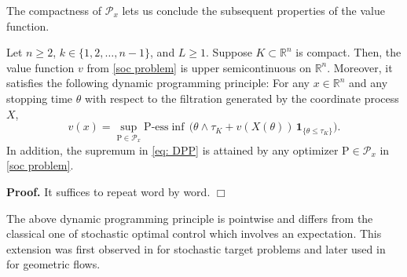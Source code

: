 \documentclass[11pt]{amsart}
\numberwithin{equation}{section}
\newcommand{\ep}{\hfill $\Box$}
\begin{document}
\medskip

The compactness of $\mathcal{P}_x$ lets us conclude the subsequent properties of the value function.

\begin{prop}\label{prop: dpp}
Let $n\geq 2$, $k\in\{1,2,\ldots,n-1\}$, and $L\ge1$. Suppose $K\subset \mathbb{R}^n$ is compact. Then, the value function $v$ from \eqref{soc problem} is upper semicontinuous on $\mathbb{R}^n$. Moreover, it satisfies the following dynamic programming principle: For any $x\in\mathbb{R}^n$ and any stopping time $\theta$ with respect to the filtration generated by the coordinate process $X$,
\begin{equation}\label{eq: DPP}
v(x) = \sup_{\mathrm{P}\in\mathcal{P}_x} \mathrm{P}\text{-}\mathrm{ess} \inf \, \big(\theta\wedge\tau_K + v(X(\theta))\,\mathbf{1}_{\{\theta\leq \tau_K\}}\big).
\end{equation}
In addition, the supremum in \eqref{eq: DPP} is attained by any optimizer $\mathrm{P}\in \mathcal{P}_x$ in \eqref{soc problem}.
\end{prop}

\smallskip

\noindent\textbf{Proof.} It suffices to repeat \cite[proofs of Proposition 2.2(ii), (iii)]{larsson_minimum_2022} word by word. \ep

\begin{rmk}
The above dynamic programming principle is pointwise and differs from the classical one
of stochastic optimal control which involves an expectation. This extension was first observed in \cite{ST98} for stochastic target problems and later used in \cite{soner_dynamic_2002} for geometric flows.
\end{rmk}

%
%
\end{document}
